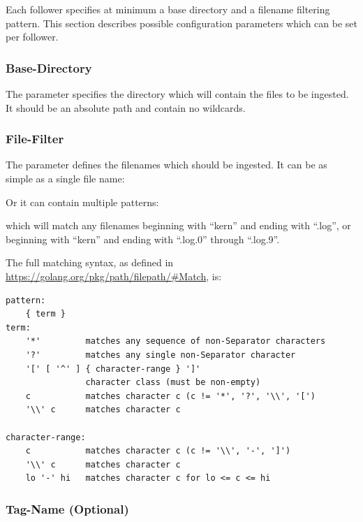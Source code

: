 Each follower specifies at minimum a base directory and a filename
filtering pattern. This section describes possible configuration
parameters which can be set per follower.

\subsubsection{Base-Directory}

The  parameter specifies the directory which will
contain the files to be ingested. It should be an absolute path and
contain no wildcards.

\subsubsection{File-Filter}

The  parameter defines the filenames which should be
ingested. It can be as simple as a single file name:


Or it can contain multiple patterns:


which will match any filenames beginning with ``kern'' and ending with
``.log'', or beginning with ``kern'' and ending with ``.log.0''
through ``.log.9''.

The full matching syntax, as defined
in \href{https://golang.org/pkg/path/filepath/\#Match}{https://golang.org/pkg/path/filepath/\#Match}, is:

\begin{Verbatim}[breaklines=true]
pattern:
    { term }
term:
    '*'         matches any sequence of non-Separator characters
    '?'         matches any single non-Separator character
    '[' [ '^' ] { character-range } ']'
                character class (must be non-empty)
    c           matches character c (c != '*', '?', '\\', '[')
    '\\' c      matches character c

character-range:
    c           matches character c (c != '\\', '-', ']')
    '\\' c      matches character c
    lo '-' hi   matches character c for lo <= c <= hi
\end{Verbatim}

\subsubsection{Tag-Name (Optional)}


